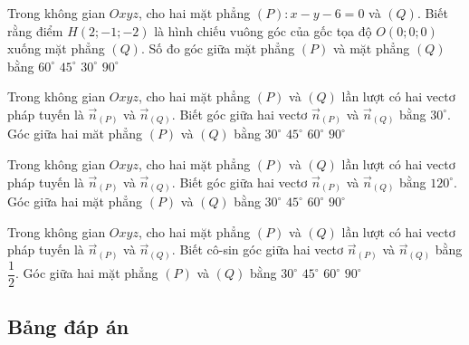 \begin{ex}%
	Trong không gian $Oxyz$, cho hai mặt phẳng $(P)\colon x-y-6=0$ và $(Q)$. Biết rằng điểm $H(2;-1;-2)$ là hình chiếu vuông góc của gốc tọa độ $O(0;0;0)$ xuống mặt phẳng $(Q)$. Số đo góc giữa mặt phẳng $(P)$ và mặt phẳng $(Q)$ bằng
	\choice
	{$60^{\circ}$}
	{\True $45^{\circ}$}
	{$30^{\circ}$}
	{$90^{\circ}$}
\end{ex}

\begin{ex}%
	Trong không gian $Oxyz$, cho hai mặt phẳng $(P)$ và $(Q)$ lần lượt có hai vectơ pháp tuyến là $\overrightarrow{n}_{(P)}$ và $\overrightarrow{n}_{(Q)}$. Biết góc giữa hai vectơ $\overrightarrow{n}_{(P)}$ và $\overrightarrow{n}_{(Q)}$ bằng $30^{\circ}$. Góc giữa hai măt phẳng $(P)$ và $(Q)$ bằng
	\choice
	{\True $30^{\circ}$}
	{$45^{\circ}$}
	{$60^{\circ}$}
	{$90^{\circ}$}
\end{ex}

\begin{ex}%
	Trong không gian $Oxyz$, cho hai mặt phẳng $(P)$ và $(Q)$ lần lượt có hai vectơ pháp tuyến là $\overrightarrow{n}_{(P)}$ và $\overrightarrow{n}_{(Q)}$. Biết góc giữa hai vectơ $\overrightarrow{n}_{(P)}$ và $\overrightarrow{n}_{(Q)}$ bằng $120^{\circ}$. Góc giữa hai mặt phẳng $(P)$ và $(Q)$ bằng
	\choice
	{$30^{\circ}$}
	{$45^{\circ}$}
	{\True $60^{\circ}$}
	{$90^{\circ}$}
\end{ex}

\begin{ex}%
	Trong không gian $Oxyz$, cho hai mặt phẳng $(P)$ và $(Q)$ lần lượt có hai vectơ pháp tuyến là $\overrightarrow{n}_{(P)}$ và $\overrightarrow{n}_{(Q)}$. Biết cô-sin góc giữa hai vectơ $\overrightarrow{n}_{(P)}$ và $\overrightarrow{n}_{(Q)}$ bằng $\dfrac{1}{2}$. Góc giữa hai mặt phẳng $(P)$ và $(Q)$ bằng
	\choice
	{$30^{\circ}$}
	{$45^{\circ}$}
	{\True $60^{\circ}$}
	{$90^{\circ}$}
\end{ex}

\subsection{Bảng đáp án}
